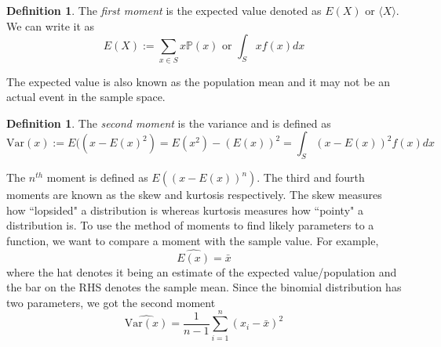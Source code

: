 \documentclass{article}
\newcommand{\p}{\mathbb{P}}
\theoremstyle{definition}
\newtheorem{definition}[theorem]{Definition}
\begin{document}
\begin{definition}
    The \emph{first moment} is the expected value denoted as $E(X)$ or $\langle X\rangle$. We can write it as 
    \begin{equation*}
        E(X) := \sum_{x\in S}x\p(x) \text{ or }\int_S xf(x)dx 
    \end{equation*}
\end{definition}
The expected value is also known as the population mean and it may not be an actual event in the sample space. 
\begin{definition}
    The \emph{second moment} is the variance and is defined as 
    \begin{equation*}
        \text{Var}(x) := E((x-E(x)^2)=E(x^2)-(E(x))^2 =\int_S (x-E(x))^2f(x)dx
    \end{equation*}
\end{definition}
The $n^{th}$ moment is defined as $E((x-E(x))^n)$. The third and fourth moments are known as the skew and kurtosis respectively. The skew measures how ``lopsided" a distribution is whereas kurtosis measures how ``pointy" a distribution is. To use the method of moments to find likely parameters to a function, we want to compare a moment with the sample value. For example, 
\begin{equation*}
    \widehat{E(x)} = \bar x
\end{equation*}
where the hat denotes it being an estimate of the expected value/population and the bar on the RHS denotes the sample mean. Since the binomial distribution has two parameters, we got the second moment 
\begin{equation*}
    \widehat{\text{Var}(x)} = \frac{1}{n-1}\sum^n_{i=1}(x_i-\bar x)^2
\end{equation*}
\end{document}
